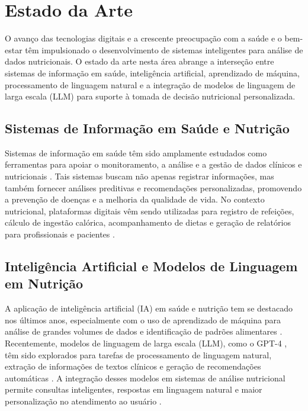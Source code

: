 \chapter{Estado da Arte}\label{cap:1-est-art}

O avanço das tecnologias digitais e a crescente preocupação com a saúde e o bem-estar têm impulsionado o desenvolvimento de sistemas inteligentes para análise de dados nutricionais. O estado da arte nesta área abrange a interseção entre sistemas de informação em saúde, inteligência artificial, aprendizado de máquina, processamento de linguagem natural e a integração de modelos de linguagem de larga escala (LLM) para suporte à tomada de decisão nutricional personalizada.

\section{Sistemas de Informação em Saúde e Nutrição}

Sistemas de informação em saúde têm sido amplamente estudados como ferramentas para apoiar o monitoramento, a análise e a gestão de dados clínicos e nutricionais \cite{hersh2022health}. Tais sistemas buscam não apenas registrar informações, mas também fornecer análises preditivas e recomendações personalizadas, promovendo a prevenção de doenças e a melhoria da qualidade de vida. No contexto nutricional, plataformas digitais vêm sendo utilizadas para registro de refeições, cálculo de ingestão calórica, acompanhamento de dietas e geração de relatórios para profissionais e pacientes \cite{martins2021aplicativos}.

\section{Inteligência Artificial e Modelos de Linguagem em Nutrição}

A aplicação de inteligência artificial (IA) em saúde e nutrição tem se destacado nos últimos anos, especialmente com o uso de aprendizado de máquina para análise de grandes volumes de dados e identificação de padrões alimentares \cite{topol2019deep, chen2020artificial}. Recentemente, modelos de linguagem de larga escala (LLM), como o GPT-4 \cite{openai2023gpt4}, têm sido explorados para tarefas de processamento de linguagem natural, extração de informações de textos clínicos e geração de recomendações automáticas \cite{singhal2023large}. A integração desses modelos em sistemas de análise nutricional permite consultas inteligentes, respostas em linguagem natural e maior personalização no atendimento ao usuário \cite{wang2023llmhealth}.

